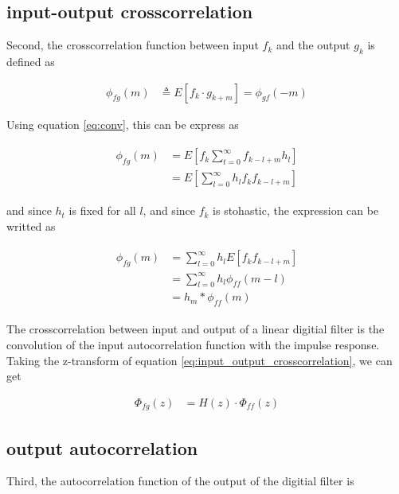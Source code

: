 \documentclass[8pt,a4paper]{article}
\begin{document}
\begin{multicols}{2}
\subsection*{input-output crosscorrelation}

Second, the crosscorrelation function between input $f_{k}$ and the output $g_{k}$ is defined as


\begin{align}
  \phi_{fg}(m) &\triangleq E \left[ f_{k} \cdot g_{k+m} \right] = \phi_{gf}(-m)
\end{align}

Using equation \ref{eq:conv}, this can be express as

\begin{align}
  \begin{split}
    \phi_{fg}(m) &= E \left[ f_{k} \sum_{t=0}^{\infty} f_{k-l+m}h_{l} \right]\\
    &= E \left[ \sum_{l=0}^{\infty} h_{l} f_{k} f_{k-l+m} \right]
  \end{split}
\end{align}

and since $h_{t}$ is fixed for all $ l $, and since $f_{k}$ is stohastic, the expression can be writted as

\begin{align}
  \label{eq:input_output_crosscorrelation}
  \begin{split}
    \phi_{fg}(m) &= \sum_{l=0}^{\infty} h_{l} E \left[ f_{k} f_{k-l+m} \right] \\
    &= \sum_{l=0}^{\infty} h_{l} \phi_{ff}(m-l) \\
    &= h_{m} * \phi_{ff}(m)
  \end{split}
\end{align}

The crosscorrelation between input and output of a linear digitial filter is the convolution of the input autocorrelation function with the impulse response.
Taking the z-transform of equation \ref{eq:input_output_crosscorrelation}, we can get 

\begin{align}
  \Phi_{fg}(z)&=H(z) \cdot \Phi_{ff}(z)
\end{align}

\subsection*{output autocorrelation}
Third, the autocorrelation function of the output of the digitial filter is


\end{multicols}
\end{document}
